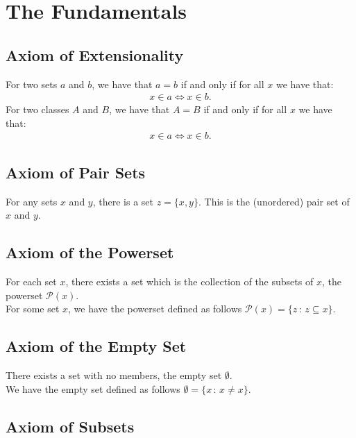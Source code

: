\section{The Fundamentals}

\subsection{Axiom of Extensionality}

For two sets $a$ and $b$, we have that $a = b$ if and only if for all
$x$ we have that: \begin{align*}
    x \in a \Longleftrightarrow x \in b.
\end{align*} 
For two classes $A$ and $B$, we have that $A = B$ if and only if for all
$x$ we have that: \begin{align*}
    x \in a \Longleftrightarrow x \in b.
\end{align*}

\subsection{Axiom of Pair Sets}

For any sets $x$ and $y$, there is a set $z = \{x, y\}$. This is the
(unordered) pair set of $x$ and $y$.

\subsection{Axiom of the Powerset}

For each set $x$, there exists a set which is the collection of the
subsets of $x$, the powerset $\mathcal{P}(x)$.
\\[\baselineskip]
For some set $x$, we have the powerset defined as follows 
$\mathcal{P}(x) = \{z \, : \, z \subseteq x\}$.

\subsection{Axiom of the Empty Set}

There exists a set with no members, the empty set $\emptyset$.
\\[\baselineskip]
We have the empty set defined as follows 
$\emptyset = \{x \, : \, x \neq x\}$.

\subsection{Axiom of Subsets}


